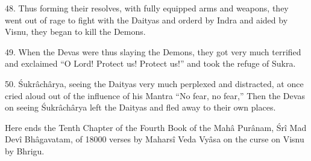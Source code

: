 48. Thus forming their resolves, with fully equipped arms and weapons, they went out of rage to fight with the Daityas and orderd by Indra and aided by Visnu, they began to kill the Demons.

49. When the Devas were thus slaying the Demons, they got very much terrified and exclaimed ``O Lord! Protect us! Protect us!'' and took the refuge of Sukra.

50. \'Sukr\^ach\^arya, seeing the Daityas very much perplexed and distracted, at once cried aloud out of the influence of his Mantra ``No fear, no fear,'' Then the Devas on seeing \'Sukr\^ach\^arya left the Daityas and fled away to their own places.

Here ends the Tenth Chapter of the Fourth Book of the Mah\^a Pur\^anam, \'Sr\^i Mad Dev\^i Bh\^agavatam, of 18000 verses by Mahars\^i Veda Vy\^asa on the curse on Visnu by Bhrigu.